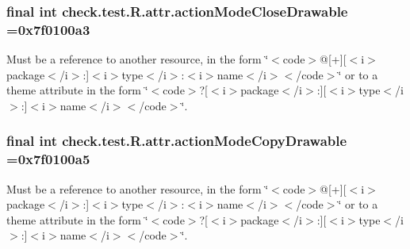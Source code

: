 \subsubsection[{action\+Mode\+Close\+Drawable}]{\setlength{\rightskip}{0pt plus 5cm}final int check.\+test.\+R.\+attr.\+action\+Mode\+Close\+Drawable =0x7f0100a3\hspace{0.3cm}{\ttfamily [static]}}\label{classcheck_1_1test_1_1_r_1_1attr_a3a9c3f760732e5561dc9790d43141bf7}
Must be a reference to another resource, in the form \char`\"{}$<$code$>$@\mbox{[}+\mbox{]}\mbox{[}$<$i$>$package$<$/i$>$\+:\mbox{]}$<$i$>$type$<$/i$>$\+:$<$i$>$name$<$/i$>$$<$/code$>$\char`\"{} or to a theme attribute in the form \char`\"{}$<$code$>$?\mbox{[}$<$i$>$package$<$/i$>$\+:\mbox{]}\mbox{[}$<$i$>$type$<$/i$>$\+:\mbox{]}$<$i$>$name$<$/i$>$$<$/code$>$\char`\"{}. \hypertarget{classcheck_1_1test_1_1_r_1_1attr_ac1d1297be46cfa54f32f7903f5259324}{}
\subsubsection[{action\+Mode\+Copy\+Drawable}]{\setlength{\rightskip}{0pt plus 5cm}final int check.\+test.\+R.\+attr.\+action\+Mode\+Copy\+Drawable =0x7f0100a5\hspace{0.3cm}{\ttfamily [static]}}\label{classcheck_1_1test_1_1_r_1_1attr_ac1d1297be46cfa54f32f7903f5259324}
Must be a reference to another resource, in the form \char`\"{}$<$code$>$@\mbox{[}+\mbox{]}\mbox{[}$<$i$>$package$<$/i$>$\+:\mbox{]}$<$i$>$type$<$/i$>$\+:$<$i$>$name$<$/i$>$$<$/code$>$\char`\"{} or to a theme attribute in the form \char`\"{}$<$code$>$?\mbox{[}$<$i$>$package$<$/i$>$\+:\mbox{]}\mbox{[}$<$i$>$type$<$/i$>$\+:\mbox{]}$<$i$>$name$<$/i$>$$<$/code$>$\char`\"{}. \hypertarget{classcheck_1_1test_1_1_r_1_1attr_a691190563ca01ec16e2456ac64fc5a72}{}
